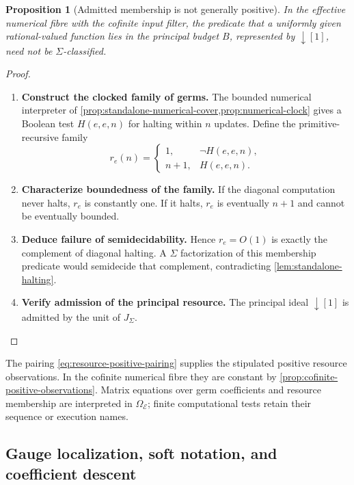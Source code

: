 \documentclass[11pt,a4paper]{article}
\numberwithin{algorithm}{section}
\numberwithin{equation}{section}
\newtheorem{proposition}[proposition]{Proposition}
\theoremstyle{definition}
\theoremstyle{remark}
\theoremstyle{plain}
\newcommand{\E}{\mathcal E}
\newcommand{\Truth}{\Omega_{\E}}
\newcommand{\J}{J_{\Sigma}}
\theoremstyle{definition}
\theoremstyle{plain}
\begin{document}
\begin{proposition}[Admitted membership is not generally positive]
\label{prop:nonpositive-budget}
In the effective numerical fibre with the cofinite input filter, the
predicate that a uniformly given rational-valued function lies in the principal
budget $B$, represented by $\downarrow[1]$, need not be $\Sigma$-classified.
\end{proposition}
\begin{proof}\leavevmode
\begin{enumerate}[leftmargin=*,align=left]
\item \textbf{Construct the clocked family of germs.}
The bounded numerical interpreter of \cref{prop:standalone-numerical-cover,prop:numerical-clock} gives a Boolean test
$H(e,e,n)$ for halting within $n$ updates. Define the primitive-recursive
family
\[
 r_e(n)=\begin{cases}1,&\neg H(e,e,n),\\n+1,&H(e,e,n).\end{cases}
\]

\item \textbf{Characterize boundedness of the family.}
If the diagonal computation never halts, $r_e$ is constantly one. If
it halts, $r_e$ is eventually $n+1$ and cannot be eventually bounded.

\item \textbf{Deduce failure of semidecidability.}
Hence $r_e=O(1)$ is exactly the complement of diagonal halting. A
$\Sigma$ factorization of this membership predicate would semidecide
that complement, contradicting \cref{lem:standalone-halting}.

\item \textbf{Verify admission of the principal resource.}
The principal ideal $\downarrow[1]$ is admitted by the unit of $\J$.
\end{enumerate}
\end{proof}

The pairing \eqref{eq:resource-positive-pairing} supplies the stipulated
positive resource observations. In the cofinite numerical fibre they
are constant by \cref{prop:cofinite-positive-observations}.
Matrix equations over germ coefficients and resource membership
are interpreted in $\Truth$; finite computational tests retain
their sequence or execution names.

\subsection{Gauge localization, soft notation, and coefficient descent}
\label{sec:transport}
\end{document}
